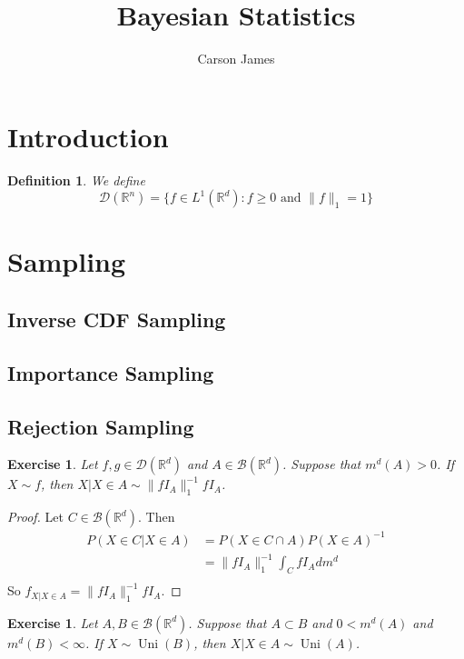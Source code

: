 \documentclass[12pt]{amsart}
\newtheorem{defn}[thm]{Definition}
\newtheorem{ex}[thm]{Exercise}
\newcommand{\R}{\mathbb{R}}
\newcommand{\MB}{\mathcal{B}}
\newcommand{\MD}{\mathcal{D}}
\DeclareMathOperator{\uni}{Uni}
\begin{document}
	
	\title{Bayesian Statistics}
	\author{Carson James}
	\maketitle
	
	\tableofcontents
	
	\section{Introduction}
	\begin{defn}
		We define $$\MD(\R^n) = \{f \in L^1(\R^d) : f \geq 0 \text{ and } \|f\|_1 = 1\}$$
	\end{defn}
	
	\section{Sampling}
	
	\subsection{Inverse CDF Sampling}
	
	\subsection{Importance Sampling}
	
	\subsection{Rejection Sampling}
	
	\begin{ex}
		Let $f, g \in \MD(\R^d)$ and $A \in \MB(\R^d)$. Suppose that $m^d(A) > 0$. If $X \sim f$, then $X|X \in A \sim \|fI_A\|_1^{-1}fI_A$. 
	\end{ex}

	\begin{proof}
		Let $C \in \MB(\R^d)$. Then
		\begin{align*}
			P(X \in C|X \in A)
			&= P(X \in C \cap A) P(X \in A)^{-1} \\
			&= \|fI_A\|_1^{-1} \int_C fI_A dm^d \\
		\end{align*}
		So $f_{X|X \in A} = \|fI_A\|_1^{-1}fI_A$.
	\end{proof}
	
	\begin{ex}
		Let $A, B \in \MB(\R^d)$. Suppose that $A \subset B$ and $0 < m^d(A)$ and $ m^{d}(B) < \infty$. If $X \sim \uni(B)$, then $X|X \in A \sim \uni(A)$. 
	\end{ex}
\end{document}
